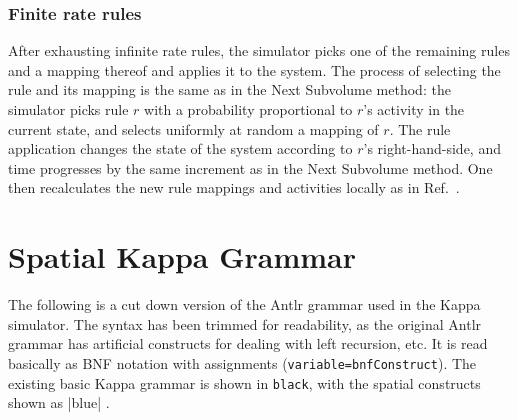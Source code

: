 \documentclass[english]{report}
\newcommand{\newbnf}[1]{\colorbox[rgb]{0.8,0.8,1}{#1}}
\begin{document}
\subsection{Finite rate rules}
After exhausting infinite rate rules, the simulator picks one of the remaining rules and a mapping thereof and applies it to the system. The process of selecting the rule and its mapping is the same as in the Next Subvolume method: the simulator picks rule $r$ with a probability proportional to $r$'s activity in the current state, and selects uniformly at random a 
mapping of $r$.
The rule application changes the state of the system according to $r$'s right-hand-side, and time progresses by the same increment as in the Next Subvolume method. One then recalculates the new rule mappings and activities locally as in Ref.~\citep{danos2007scalable}.


\appendix

%
\chapter{Spatial Kappa Grammar}
\label{chap:spatialGrammar}



The following is a cut down version of the Antlr grammar used in the Kappa simulator. The syntax has been trimmed for readability, as the original Antlr grammar has artificial constructs for dealing with left recursion, etc. It is read basically as BNF notation with assignments (\verb|variable=bnfConstruct|). The existing basic Kappa grammar is shown in \verb|black|, with the spatial constructs shown as |blue| \newbnf{}. 
\end{document}
